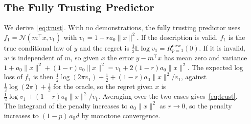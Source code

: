 \documentclass[10pt]{article}
\newcommand{\E}{\mathbb{E}}
\begin{document}
\subsection{The Fully Trusting Predictor}\label{app:trust}
We derive~\eqref{eq:trust}. With no demonstrations, the fully trusting predictor uses $f_1 = \mathcal{N}(m^\top x, v_1)$ with $v_1 = 1 + r a_0 \|x\|^2$. If the description is valid, $f_1$ is the true conditional law of $y$ and the regret is $\tfrac12 \E \log v_1 = R^{\mathrm{desc}}_{p=1}(0)$. If it is invalid, $w$ is independent of $m$, so given $x$ the error $y - m^\top x$ has mean zero and variance $1 + a_0\|x\|^2 + (1-r)a_0\|x\|^2 = v_1 + 2(1-r)a_0\|x\|^2$. The expected log loss of $f_1$ is then $\tfrac12 \log(2\pi v_1) + \tfrac12 + (1-r)a_0\|x\|^2/v_1$, against $\tfrac12 \log(2\pi) + \tfrac12$ for the oracle, so the regret given $x$ is $\tfrac12 \log v_1 + (1-r)a_0\|x\|^2/v_1$. Averaging over the two cases gives~\eqref{eq:trust}. The integrand of the penalty increases to $a_0\|x\|^2$ as $r \to 0$, so the penalty increases to $(1-p)\,a_0 d$ by monotone convergence.
\end{document}
